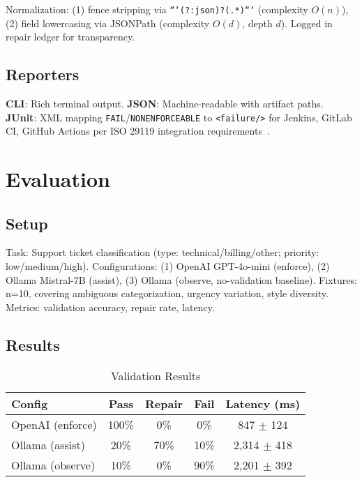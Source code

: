 \documentclass[sigconf]{acmart}
\begin{document}
Normalization: (1) fence stripping via \texttt{```(?:json)?(.*)```} (complexity \( O(n) \)), (2) field lowercasing via JSONPath (complexity \( O(d) \), depth \( d \)). Logged in repair ledger for transparency.

\subsection{Reporters}

\textbf{CLI}: Rich terminal output. \textbf{JSON}: Machine-readable with artifact paths. \textbf{JUnit}: XML mapping \texttt{FAIL}/\texttt{NONENFORCEABLE} to \texttt{<failure/>} for Jenkins, GitLab CI, GitHub Actions per ISO 29119 integration requirements~\cite{iso29119}.

\section{Evaluation}

\subsection{Setup}

Task: Support ticket classification (type: technical/billing/other; priority: low/medium/high). Configurations: (1) OpenAI GPT-4o-mini (enforce), (2) Ollama Mistral-7B (assist), (3) Ollama (observe, no-validation baseline). Fixtures: n=10, covering ambiguous categorization, urgency variation, style diversity. Metrics: validation accuracy, repair rate, latency.

\subsection{Results}

\begin{table}[H]
\centering
\caption{Validation Results}
\label{tab:results}
\scriptsize
\begin{tabular}{@{}lcccc@{}}
\toprule
\textbf{Config} & \textbf{Pass} & \textbf{Repair} & \textbf{Fail} & \textbf{Latency (ms)} \\
\midrule
OpenAI (enforce) & 100\% & 0\% & 0\% & 847 \(\pm\) 124 \\
Ollama (assist) & 20\% & 70\% & 10\% & 2,314 \(\pm\) 418 \\
Ollama (observe) & 10\% & 0\% & 90\% & 2,201 \(\pm\) 392 \\
\bottomrule
\end{tabular}
\end{table}
\end{document}
